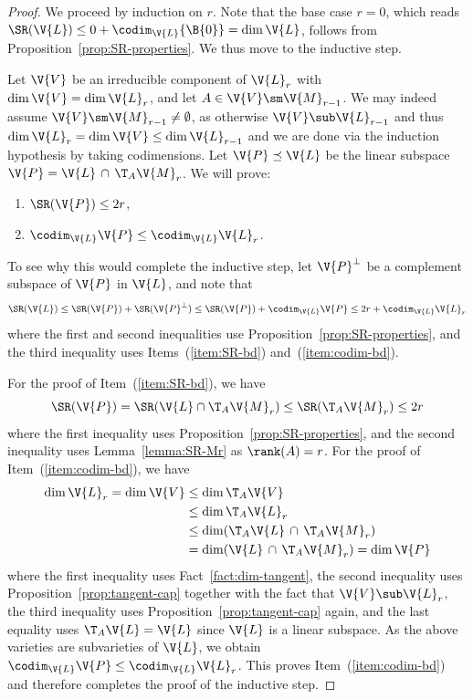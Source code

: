 \begin{proof}
We proceed by induction on $r$. Note that the base case $r=0$, which reads $\SR(\V{L}) \le 0+\codim_\V{L} \{\B{0}\} = \dim \V{L}$, follows from Proposition~\ref{prop:SR-properties}.
We thus move to the inductive step. 

Let $\V{V}$ be an irreducible component of $\V{L}_r$ with $\dim \V{V} = \dim \V{L}_r$,
and let $A \in \V{V} \sm \V{M}_{r-1}$.
We may indeed assume $\V{V} \sm \V{M}_{r-1} \neq \emptyset$, as otherwise $\V{V} \sub \V{L}_{r-1}$ and thus 
$\dim\V{L}_r = \dim\V{V} \le \dim \V{L}_{r-1}$ 
and we are done via the induction hypothesis by taking codimensions.
Let $\V{P} \preceq \V{L}$ be the linear subspace 
$\V{P} = \V{L} \,\cap\, \T_A\V{M}_r$. 
We will prove:
\begin{enumerate}
	\item\label{item:SR-bd} $\SR(\V{P}) \le 2r$, 
	\item\label{item:codim-bd} $\codim_\V{L} \V{P} \le \codim_\V{L} \V{L}_r$.
\end{enumerate}
To see why this would complete the inductive step, 
let $\V{P}^\perp$ be a complement subspace of $\V{P}$ in $\V{L}$, 
and note that
$$\SR(\V{L}) \le \SR(\V{P}) + \SR(\V{P}^\perp) \le \SR(\V{P}) + \codim_{\V{L}} \V{P} \le 2r + \codim_{\V{L}} \V{L}_r$$
where the first and second inequalities use Proposition~\ref{prop:SR-properties}, and the third inequality uses Items~(\ref{item:SR-bd}) and~(\ref{item:codim-bd}). 

For the proof of Item~(\ref{item:SR-bd}), we have
$$\SR(\V{P}) = \SR(\V{L} \cap \T_A \V{M}_r) \le \SR(\T_A \V{M}_r) \le 2r$$
where the first inequality uses Proposition~\ref{prop:SR-properties}, and the second inequality uses Lemma~\ref{lemma:SR-Mr} as $\rank(A)=r$.
For the proof of Item~(\ref{item:codim-bd}), we have
\begin{align*}
	\dim\V{L}_r = \dim \V{V} &\le \dim \T_A \V{V} \\ 
	&\le \dim \T_A \V{L}_r\\
	&\le \dim( \T_A \V{L} \,\cap\, \T_A \V{M}_r) \\
	&= \dim(\V{L} \,\cap\, \T_A \V{M}_r) 
	= \dim \V{P}
\end{align*}
where the first inequality uses Fact~\ref{fact:dim-tangent}, 
the second inequality uses Proposition~\ref{prop:tangent-cap} together with the fact that $\V{V} \sub \V{L}_r$, 
the third inequality uses Proposition~\ref{prop:tangent-cap} again,
and the last equality uses $\T_A \V{L}=\V{L}$ since $\V{L}$ is a linear subspace.
As the above varieties are subvarieties of $\V{L}$, we obtain
$\codim_{\V{L}} \V{P} \le \codim_{\V{L}} \V{L}_r$.
This proves Item~(\ref{item:codim-bd}) and therefore completes the proof of the inductive step.
\end{proof}

